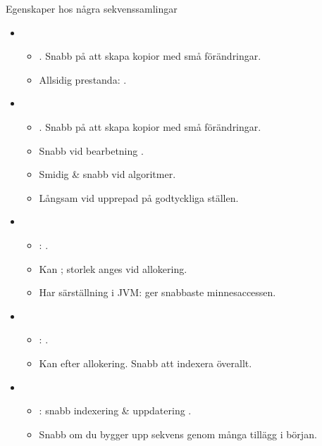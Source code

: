 \begin{Slide}{Egenskaper hos några sekvenssamlingar}
\vspace{-0.5em}
\begin{itemize}\SlideFontSmall

\item {} 
  \begin{itemize}\SlideFontSmall
  \item {}. Snabb på att skapa kopior med små förändringar.
  \item Allsidig prestanda: .
  \end{itemize}

\item {}   
  \begin{itemize}\SlideFontSmall
  \item {}. Snabb på att skapa kopior med små förändringar.
  \item Snabb vid bearbetning . 
  \item Smidig \& snabb vid  algoritmer.
  \item Långsam vid upprepad  på godtyckliga ställen.
  \end{itemize}

\item {} 
  \begin{itemize}\SlideFontSmall
  \item {}: .
  \item Kan ; storlek anges vid allokering.
  \item Har särställning i JVM: ger snabbaste minnesaccessen.
  \end{itemize}

\item {}  
  \begin{itemize}\SlideFontSmall
  \item {}: .
  \item Kan  efter allokering. Snabb att indexera överallt.
  \end{itemize}

\item {}  
  \begin{itemize}\SlideFontSmall
  \item {}: snabb indexering \& uppdatering .
  \item Snabb om du bygger upp sekvens genom många tillägg i början.
  \end{itemize}

\end{itemize}
\end{Slide}



